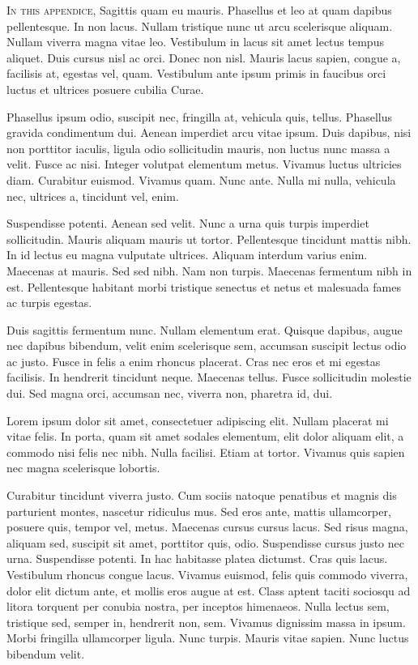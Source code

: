 \introformatting
\label{app:appendice1}

\lettrine{I}{n this appendice}, 
Sagittis quam eu mauris. Phasellus et leo at quam dapibus pellentesque. In non
lacus. Nullam tristique nunc ut arcu scelerisque aliquam. Nullam viverra magna
vitae leo. Vestibulum in lacus sit amet lectus tempus aliquet. Duis cursus nisl
ac orci. Donec non nisl. Mauris lacus sapien, congue a, facilisis at, egestas
vel, quam. Vestibulum ante ipsum primis in faucibus orci luctus et ultrices
posuere cubilia Curae.

Phasellus ipsum odio, suscipit nec, fringilla at, vehicula quis, tellus.
Phasellus gravida condimentum dui. Aenean imperdiet arcu vitae ipsum. Duis
dapibus, nisi non porttitor iaculis, ligula odio sollicitudin mauris, non luctus
nunc massa a velit. Fusce ac nisi. Integer volutpat elementum metus. Vivamus
luctus ultricies diam. Curabitur euismod. Vivamus quam. Nunc ante. Nulla mi
nulla, vehicula nec, ultrices a, tincidunt vel, enim.

Suspendisse potenti. Aenean sed velit. Nunc a urna quis turpis imperdiet
sollicitudin. Mauris aliquam mauris ut tortor. Pellentesque tincidunt mattis
nibh. In id lectus eu magna vulputate ultrices. Aliquam interdum varius enim.
Maecenas at mauris. Sed sed nibh. Nam non turpis. Maecenas fermentum nibh in
est. Pellentesque habitant morbi tristique senectus et netus et malesuada fames
ac turpis egestas.

Duis sagittis fermentum nunc. Nullam elementum erat. Quisque dapibus, augue nec
dapibus bibendum, velit enim scelerisque sem, accumsan suscipit lectus odio ac
justo. Fusce in felis a enim rhoncus placerat. Cras nec eros et mi egestas
facilisis. In hendrerit tincidunt neque. Maecenas tellus. Fusce sollicitudin
molestie dui. Sed magna orci, accumsan nec, viverra non, pharetra id, dui.

Lorem ipsum dolor sit amet, consectetuer adipiscing elit. Nullam placerat mi
vitae felis. In porta, quam sit amet sodales elementum, elit dolor aliquam elit,
a commodo nisi felis nec nibh. Nulla facilisi. Etiam at tortor. Vivamus quis
sapien nec magna scelerisque lobortis.

Curabitur tincidunt viverra justo. Cum sociis natoque penatibus et magnis dis
parturient montes, nascetur ridiculus mus. Sed eros ante, mattis ullamcorper,
posuere quis, tempor vel, metus. Maecenas cursus cursus lacus. Sed risus magna,
aliquam sed, suscipit sit amet, porttitor quis, odio. Suspendisse cursus justo
nec urna. Suspendisse potenti. In hac habitasse platea dictumst. Cras quis
lacus. Vestibulum rhoncus congue lacus. Vivamus euismod, felis quis commodo
viverra, dolor elit dictum ante, et mollis eros augue at est. Class aptent
taciti sociosqu ad litora torquent per conubia nostra, per inceptos himenaeos.
Nulla lectus sem, tristique sed, semper in, hendrerit non, sem. Vivamus
dignissim massa in ipsum. Morbi fringilla ullamcorper ligula. Nunc turpis.
Mauris vitae sapien. Nunc luctus bibendum velit.

